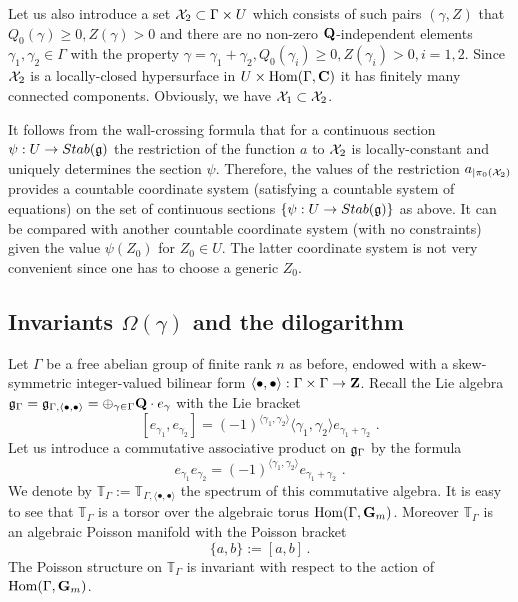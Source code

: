 \documentclass[12pt]{article}
\begin{document}
Let us also introduce a set ${\cal X}_2\subset \Gamma\times U$ which consists  of such pairs $(\gamma,Z)$ that $Q_0(\gamma)\geqslant 0, Z(\gamma)>0$ and there are no non-zero ${\bf Q}$-independent elements $\gamma_1,\gamma_2\in \Gamma$ with the property $\gamma=\gamma_1+\gamma_2, Q_0(\gamma_i)\geqslant 0, Z(\gamma_i)>0, i=1,2$. Since ${\cal X}_2$ is a locally-closed hypersurface in $U\times \operatorname{Hom}(\Gamma,{\bf C})$ it has finitely many connected components. Obviously, we have ${\cal X}_1\subset {\cal X}_2$.

It follows from the wall-crossing formula that for a continuous section $\psi:U\to Stab({\mathfrak g})$ the restriction of the function $a$ to ${\cal X}_2$ is locally-constant and uniquely determines the section $\psi$. Therefore, the values of the restriction $a_{|\pi_0({\cal X}_2)}$ provides a countable coordinate system (satisfying a countable system of equations) on the set of continuous sections
$\{\psi: U\to Stab({\mathfrak g})\}$ as above. It can be compared with another countable coordinate system (with no constraints) given the value $\psi(Z_0)$ for $Z_0\in U$. The latter coordinate system is not very convenient since one has to choose a generic $Z_0$. 







\subsection{Invariants $\Omega(\gamma)$ and the dilogarithm}

Let $\Gamma$ be a free abelian group of finite rank $n$ as before, endowed
with a skew-symmetric integer-valued  bilinear form $\langle \bullet, \bullet\rangle : \Gamma \times \Gamma\to {\bf Z}$. Recall the Lie algebra
${\mathfrak g}_{\Gamma}={\mathfrak g}_{\Gamma,\langle \bullet,\bullet \rangle}=\oplus_{\gamma\in \Gamma}{\bf Q}\cdot e_{\gamma}$ with the Lie bracket
$$[e_{\gamma_1},e_{\gamma_2}]=(-1)^{\langle \gamma_1, \gamma_2\rangle}\langle \gamma_1, \gamma_2\rangle e_{\gamma_1+\gamma_2}\,\,.$$
Let us introduce a commutative associative product on ${\mathfrak g}_{\Gamma}$ by the formula
$$e_{\gamma_1}e_{\gamma_2}=(-1)^{\langle \gamma_1, \gamma_2\rangle}e_{\gamma_1+\gamma_2}\,\,.$$
We denote by ${\mathbb T}_{\Gamma}:={\mathbb T}_{\Gamma,\langle \bullet, \bullet\rangle}$ the spectrum of this commutative algebra. It is easy to see that ${\mathbb T}_{\Gamma}$ is a torsor over the algebraic torus $\operatorname{Hom}(\Gamma, {\bf G}_m)$. Moreover ${\mathbb T}_{\Gamma}$ is an algebraic Poisson manifold with the Poisson bracket $$\{a,b\}:=[a,b]\,.$$ The Poisson structure on ${\mathbb T}_{\Gamma}$ is invariant with respect to the action of $\operatorname{Hom}(\Gamma, {\bf G}_m)$.
\end{document}
